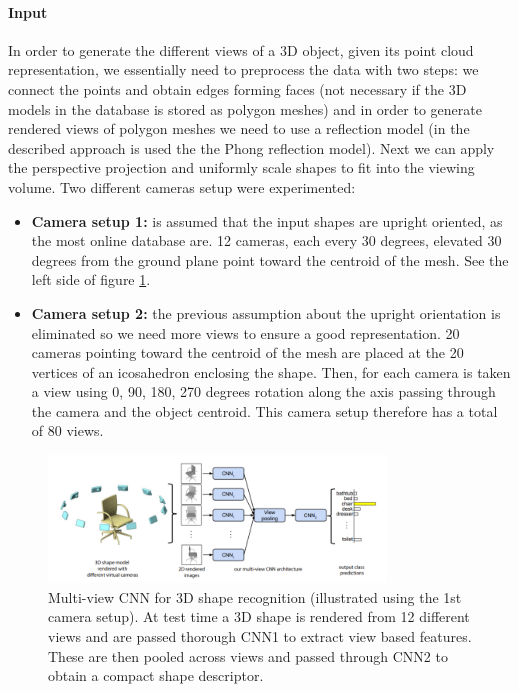 \paragraph{Input}
In order to generate the different views of a 3D object, given its point cloud representation, we essentially need to preprocess the data with two steps: 
we connect the points and obtain edges forming faces (not necessary if the 3D models in the database is stored as polygon meshes) and in order to generate rendered views of
polygon meshes we need to use a reflection model (in the described approach is used the the Phong reflection model). Next we can apply the perspective projection and uniformly scale shapes to fit into the viewing volume. 
Two different cameras setup were experimented:\begin{itemize}
\item {\textbf{Camera setup 1: } is assumed that the input shapes are upright oriented, as the most online database are. 12 cameras, each every 30 degrees, elevated 30 degrees from the ground plane point toward the centroid of the mesh. See the left side of figure \ref{fig:multiview}.}
\item {\textbf{Camera setup 2: } the previous assumption about the upright orientation is eliminated so we need more views to ensure a good representation. 20 cameras pointing toward the centroid of the mesh are placed at the 20 vertices of an icosahedron enclosing the shape. Then, for each camera is taken a view using 0, 90, 180, 270 degrees rotation along the axis passing through the camera and the object centroid. This camera setup therefore has a total of 80 views.}
\end{itemize}

\begin{figure}[ht]
    \centering
    \captionsetup{width=.8\linewidth}
    \includegraphics[width=0.8\textwidth]{images/multiview.png}
    \caption{ Multi-view CNN for 3D shape recognition (illustrated using the 1st camera setup). At test time a 3D shape is rendered from 12
different views and are passed thorough CNN1 to extract view based features. These are then pooled across views and passed through
CNN2 to obtain a compact shape descriptor.}
    \label{fig:multiview}
\end{figure}

